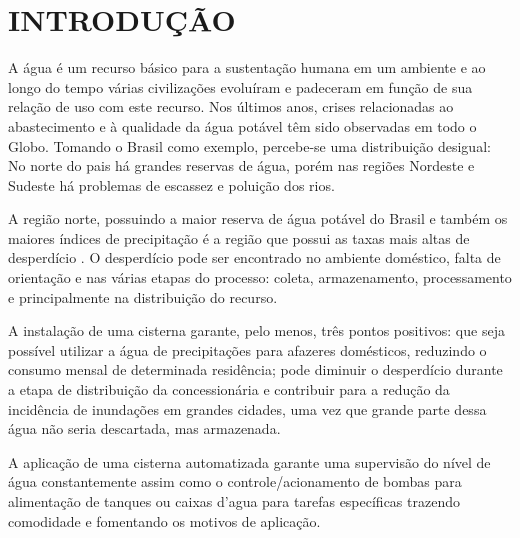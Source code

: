 
\chapter{INTRODUÇÃO}
\label{chap:introducao}


A água é um recurso básico para a sustentação humana em um ambiente e ao longo do tempo várias civilizações evoluíram e padeceram em função de sua relação de uso com este recurso. Nos últimos anos, crises relacionadas ao abastecimento e à qualidade da água potável têm sido observadas em todo o Globo. Tomando o Brasil como exemplo, percebe-se uma distribuição desigual: No norte do pais há grandes reservas de água, porém nas regiões Nordeste e Sudeste há problemas de escassez e poluição dos rios.


A região norte, possuindo a maior reserva de água potável do Brasil e também os maiores índices de precipitação é a região que possui as taxas mais altas de desperdício \cite{globo}. O desperdício pode ser encontrado no ambiente doméstico, falta de orientação e nas várias etapas do processo: coleta, armazenamento, processamento e principalmente na distribuição do recurso. 

A instalação de uma cisterna garante, pelo menos, três pontos positivos: que seja possível utilizar a água de precipitações para afazeres domésticos, reduzindo o consumo mensal de determinada residência; pode diminuir o desperdício durante a etapa de distribuição da concessionária e contribuir para a redução da
incidência de inundações em grandes cidades, uma vez que grande parte dessa água não seria descartada, mas armazenada.

A aplicação de uma cisterna automatizada garante uma supervisão do nível de água constantemente assim como o controle/acionamento de bombas para alimentação de tanques ou caixas d’agua para tarefas específicas trazendo comodidade e fomentando os motivos de aplicação.